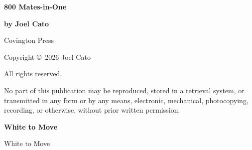 \documentclass[12pt,twoside]{article}
\begin{document}

\thispagestyle{empty}

\vspace*{0.16\textheight}

\begin{center}
{\Huge\bfseries 800 Mates-in-One\par}
\end{center}

\vspace*{0.14\textheight}

\begin{center}
\begin{minipage}{0.52\textwidth}
\centering
{\LARGE\bfseries by Joel Cato\par}
\end{minipage}
\end{center}

\vfill

\begin{center}
{\normalsize Covington Press\par}
\end{center}

\newpage

\thispagestyle{empty}

\vspace*{0.72\textheight}

\begin{center}
\small
Copyright \copyright\ 2026 Joel Cato

All rights reserved.

No part of this publication may be reproduced, stored in a retrieval system,
or transmitted in any form or by any means, electronic, mechanical,
photocopying, recording, or otherwise, without prior written permission.
\end{center}

\newpage




\newpage
{}

\begin{center}
\Large\bfseries White to Move

\vspace{0.15em}
\normalsize White to Move
\end{center}
\end{document}
